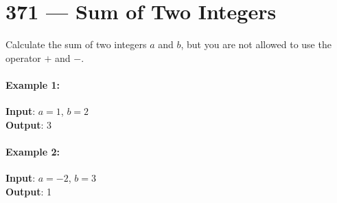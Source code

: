 \section{371 --- Sum of Two Integers}
Calculate the sum of two integers $ a $ and $ b $, but you are not allowed to use the operator $ + $ and $ - $.

\paragraph{Example 1:}

\begin{flushleft}
\textbf{Input}: $ a = 1 $, $ b = 2 $
\\
\textbf{Output}: 3
\end{flushleft}

\paragraph{Example 2:}

\begin{flushleft}
\textbf{Input}: $ a = -2 $, $ b = 3 $
\\
\textbf{Output}: 1
\end{flushleft}

